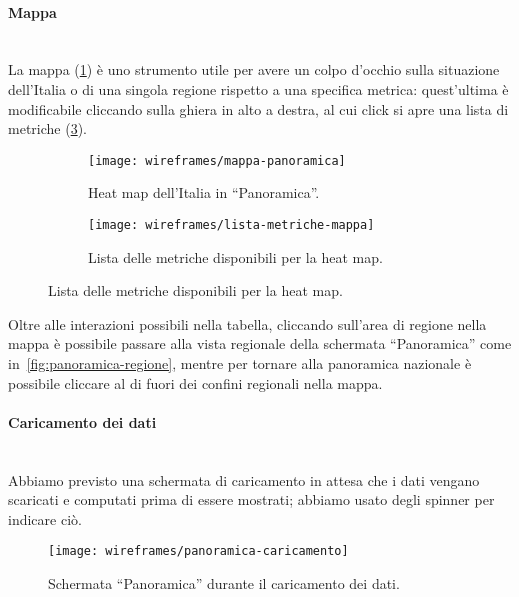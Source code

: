 \documentclass[../../../main.tex]{subfiles}
\begin{document}
\paragraph{Mappa}\mbox{}\\
La mappa (\ref{fig:mappa-panoramica}) è uno strumento utile per avere un colpo d'occhio sulla situazione dell'Italia o di una singola regione rispetto a una specifica metrica: quest'ultima è modificabile cliccando sulla ghiera in alto a destra, al cui click si apre una lista di metriche (\ref{fig:lista-metriche-mappa}).
\begin{figure}[H]
    \begin{subfigure}[b]{0.5\textwidth}
        \centering
    \texttt{[image: wireframes/mappa-panoramica]}
    \caption{Heat map dell'Italia in ``Panoramica''.}
    \label{fig:mappa-panoramica}
    \end{subfigure}
    \hfill
    \begin{subfigure}[b]{0.5\textwidth}
        \centering
        \texttt{[image: wireframes/lista-metriche-mappa]}
        \caption{Lista delle metriche disponibili per la heat map.}
        \label{fig:lista-metriche-mappa}
    \end{subfigure}
\end{figure}

Oltre alle interazioni possibili nella tabella, cliccando sull'area di regione nella mappa è possibile passare alla vista regionale della schermata ``Panoramica'' come in~\ref{fig:panoramica-regione}, mentre per tornare alla panoramica nazionale è possibile cliccare al di fuori dei confini regionali nella mappa.

\paragraph{Caricamento dei dati}\mbox{}\\
Abbiamo previsto una schermata di caricamento in attesa che i dati vengano scaricati e computati prima di essere mostrati; abbiamo usato degli spinner per indicare ciò.
\begin{figure}[H]
    \centering
    \texttt{[image: wireframes/panoramica-caricamento]}
    \caption{Schermata ``Panoramica'' durante il caricamento dei dati.}
    \label{fig:panoramica-caricamento}
\end{figure}
\end{document}
